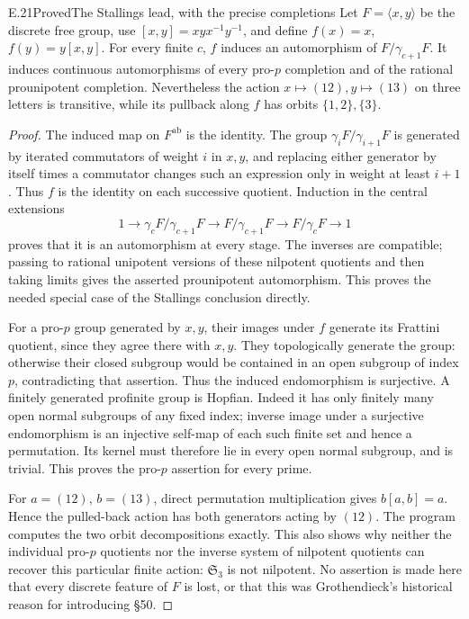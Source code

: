 \begin{statement}{E.21}{Proved}{The Stallings lead, with the precise completions}
Let \(F=\langle x,y\rangle\) be the discrete free group, use
\([x,y]=xyx^{-1}y^{-1}\), and define
\(f(x)=x\), \(f(y)=y[x,y]\).  For every finite \(c\), \(f\)
induces an automorphism of \(F/\gamma_{c+1}F\).  It induces
continuous automorphisms of every pro-\(p\) completion and of
the rational prounipotent completion.  Nevertheless the action
\(x\mapsto(12),y\mapsto(13)\) on three letters is transitive,
while its pullback along \(f\) has orbits \(\{1,2\},\{3\}\).
\end{statement}
\begin{proof}
The induced map on \(F^{\mathrm{ab}}\) is the identity.
The group \(\gamma_iF/\gamma_{i+1}F\) is generated by iterated
commutators of weight \(i\) in \(x,y\), and replacing either
generator by itself times a commutator changes such an expression
only in weight at least \(i+1\).  Thus \(f\) is the identity on
each successive quotient.  Induction in the central extensions
\[
 1\to\gamma_cF/\gamma_{c+1}F\to F/\gamma_{c+1}F
                   \to F/\gamma_cF\to1
\]
proves that it is an automorphism at every stage.  The inverses
are compatible; passing to rational unipotent versions of these
nilpotent quotients and then taking limits gives the asserted
prounipotent automorphism.  This proves the needed special case
of the Stallings conclusion directly.

For a pro-\(p\) group generated by \(x,y\), their images under
\(f\) generate its Frattini quotient, since they agree there
with \(x,y\).  They topologically generate the group: otherwise
their closed subgroup would be contained in an open subgroup
of index \(p\), contradicting that assertion.  Thus the induced
endomorphism is surjective.  A finitely generated profinite
group is Hopfian.  Indeed it has only finitely many open normal
subgroups of any fixed index; inverse image under a surjective
endomorphism is an injective self-map of each such finite set
and hence a permutation.  Its kernel must therefore lie in
every open normal subgroup, and is trivial.  This proves the
pro-\(p\) assertion for every prime.

For \(a=(12)\), \(b=(13)\), direct permutation multiplication
gives \(b[a,b]=a\).  Hence the pulled-back action has both
generators acting by \((12)\).  The program computes the two
orbit decompositions exactly.  This also shows why neither
the individual pro-\(p\) quotients nor the inverse system of
nilpotent quotients can recover this particular finite action:
\(\mathfrak S_3\) is not nilpotent.  No assertion is made here
that every discrete feature of \(F\) is lost, or that this was
Grothendieck's historical reason for introducing \S50.
\end{proof}

